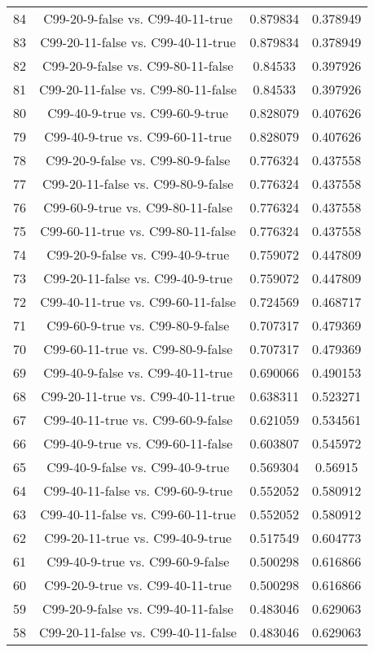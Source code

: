 \documentclass[a4paper,10pt]{article}
\begin{document}
\begin{landscape}
\begin{table}[!htp]
\begin{tabular}{cccc}
84&C99-20-9-false vs. C99-40-11-true&0.879834&0.378949\\
83&C99-20-11-false vs. C99-40-11-true&0.879834&0.378949\\
82&C99-20-9-false vs. C99-80-11-false&0.84533&0.397926\\
81&C99-20-11-false vs. C99-80-11-false&0.84533&0.397926\\
80&C99-40-9-true vs. C99-60-9-true&0.828079&0.407626\\
79&C99-40-9-true vs. C99-60-11-true&0.828079&0.407626\\
78&C99-20-9-false vs. C99-80-9-false&0.776324&0.437558\\
77&C99-20-11-false vs. C99-80-9-false&0.776324&0.437558\\
76&C99-60-9-true vs. C99-80-11-false&0.776324&0.437558\\
75&C99-60-11-true vs. C99-80-11-false&0.776324&0.437558\\
74&C99-20-9-false vs. C99-40-9-true&0.759072&0.447809\\
73&C99-20-11-false vs. C99-40-9-true&0.759072&0.447809\\
72&C99-40-11-true vs. C99-60-11-false&0.724569&0.468717\\
71&C99-60-9-true vs. C99-80-9-false&0.707317&0.479369\\
70&C99-60-11-true vs. C99-80-9-false&0.707317&0.479369\\
69&C99-40-9-false vs. C99-40-11-true&0.690066&0.490153\\
68&C99-20-11-true vs. C99-40-11-true&0.638311&0.523271\\
67&C99-40-11-true vs. C99-60-9-false&0.621059&0.534561\\
66&C99-40-9-true vs. C99-60-11-false&0.603807&0.545972\\
65&C99-40-9-false vs. C99-40-9-true&0.569304&0.56915\\
64&C99-40-11-false vs. C99-60-9-true&0.552052&0.580912\\
63&C99-40-11-false vs. C99-60-11-true&0.552052&0.580912\\
62&C99-20-11-true vs. C99-40-9-true&0.517549&0.604773\\
61&C99-40-9-true vs. C99-60-9-false&0.500298&0.616866\\
60&C99-20-9-true vs. C99-40-11-true&0.500298&0.616866\\
59&C99-20-9-false vs. C99-40-11-false&0.483046&0.629063\\
58&C99-20-11-false vs. C99-40-11-false&0.483046&0.629063\\

\end{tabular}
\end{table}
\end{landscape}
\end{document}
